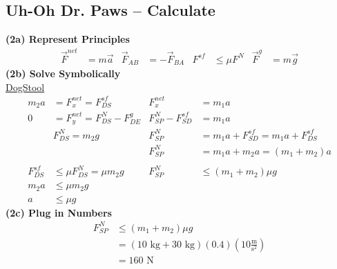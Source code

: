 \documentclass[]{article}
\begin{document}
\begin{PresentSpace}
\vspace{-10pt}
\section*{Uh-Oh Dr. Paws -- Calculate}
\vspace{-10pt}
\textbf{(2a) Represent Principles}
\begin{align*}
	\vec{F}^{net}&=m\vec{a} & \vec{F}_{AB} &= -\vec{F}_{BA} & F^{sf} &\leq \mu F^{N} & \vec{F}^{g} & = m\vec{g}
\end{align*}
\textbf{(2b) Solve Symbolically} \\
\phantom{\_}\hspace{1cm}\underline{Dog}\hspace{6.5cm}\underline{Stool}
\begin{align*}
	m_{2}a & = F^{net}_{x} = F^{sf}_{DS} & F^{net}_{x} & = m_{1}a \\
	0 & = F^{net}_{y} = F^{N}_{DS} - F^{g}_{DE} & F^{N}_{SP}-F^{sf}_{SD} & = m_{1}a \\
	& F^{N}_{DS} = m_{2}g & F^{N}_{SP} & = m_{1}a + F^{sf}_{SD} = m_{1}a+F^{sf}_{DS} \\
	& & F^{N}_{SP} & = m_{1}a+m_{2}a = (m_{1}+m_{2})a \\
	& & & \\
	F^{sf}_{DS} & \leq \mu F^{N}_{DS} = \mu m_{2}g & F^{N}_{SP} & \leq (m_{1}+m_{2})\mu g \\
	m_{2}a & \leq \mu m_{2}g & & \\
	a & \leq \mu g & &
\end{align*}
\textbf{(2c) Plug in Numbers}
\begin{align*}
	F^{N}_{SP} & \leq (m_{1}+m_{2})\mu g \\
	& = (10\text{ kg}+30\text{ kg})(0.4)\left(10\frac{\text{m}}{\text{s}^{2}}\right) \\
	& = 160\text{ N}
\end{align*}
\end{PresentSpace}
\newpage
\begin{TeacherMargin}

\end{TeacherMargin}
\end{document}
